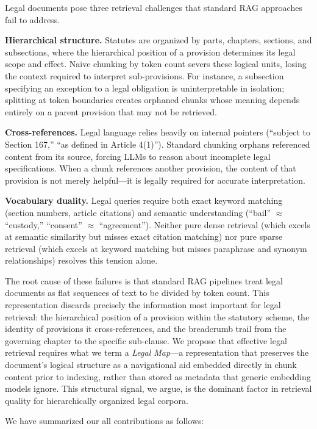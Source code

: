 \documentclass[sn-mathphys,Numbered]{sn-jnl}%
\begin{document}
Legal documents pose three retrieval challenges that standard RAG
approaches fail to address.

\textbf{Hierarchical structure.}  Statutes are organized by parts,
chapters, sections, and subsections, where the hierarchical position of a
provision determines its legal scope and effect.  Naive chunking by token
count severs these logical units, losing the context required to interpret
sub-provisions.  For instance, a subsection specifying an exception to a
legal obligation is uninterpretable in isolation; splitting at token
boundaries creates orphaned chunks whose meaning depends entirely on a
parent provision that may not be retrieved.

\textbf{Cross-references.}  Legal language relies heavily on internal
pointers (``subject to Section 167,'' ``as defined in Article 4(1)'').
Standard chunking orphans referenced content from its source, forcing LLMs
to reason about incomplete legal specifications.  When a chunk references
another provision, the content of that provision is not merely helpful---it
is legally required for accurate interpretation.

\textbf{Vocabulary duality.}  Legal queries require both exact keyword
matching (section numbers, article citations) and semantic understanding
(``bail'' $\approx$ ``custody,'' ``consent'' $\approx$ ``agreement'').
Neither pure dense retrieval (which excels at semantic similarity but misses
exact citation matching) nor pure sparse retrieval (which excels at keyword
matching but misses paraphrase and synonym relationships) resolves this
tension alone.

The root cause of these failures is that standard RAG pipelines treat legal
documents as flat sequences of text to be divided by token count.  This
representation discards precisely the information most important for legal
retrieval: the hierarchical position of a provision within the statutory
scheme, the identity of provisions it cross-references, and the breadcrumb
trail from the governing chapter to the specific sub-clause.  We propose
that effective legal retrieval requires what we term a \emph{Legal
Map}---a representation that preserves the document's logical structure as
a navigational aid embedded directly in chunk content prior to indexing,
rather than stored as metadata that generic embedding models ignore.  This
structural signal, we argue, is the dominant factor in retrieval quality for
hierarchically organized legal corpora.

We have summarized our all contributions as follows:
\end{document}
